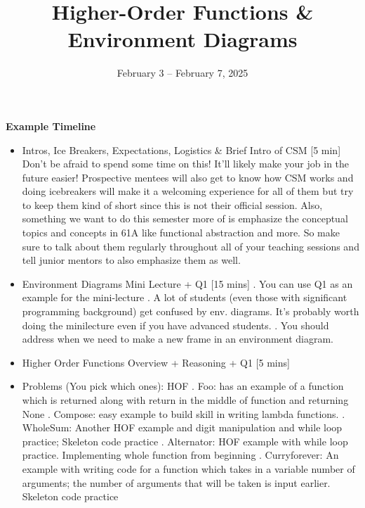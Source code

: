 \documentclass{exam}
\title{Higher-Order Functions \& Environment Diagrams}
\date{February 3 -- February 7, 2025}
\begin{document}
\maketitle

\begin{meta}
    \textbf{Example Timeline}
    \begin{itemize}
        \item Intros, Ice Breakers, Expectations, Logistics \& Brief Intro of CSM [5 min]
        \subitem Don't be afraid to spend some time on this! It'll likely make your job in the future easier! Prospective mentees will also get to know how CSM works and doing icebreakers will make it a welcoming experience for all of them but try to keep them kind of short since this is not their official session.
        \subitem Also, something we want to do this semester more of is emphasize the conceptual topics and concepts in 61A like functional abstraction and more. So make sure to talk about them regularly throughout all of your teaching sessions and tell junior mentors to also emphasize them as well.
        \item Environment Diagrams Mini Lecture + Q1 [15 mins]
        . You can use Q1 as an example for the mini-lecture
        . A lot of students (even those with significant programming background) get confused by env. diagrams. It's probably worth doing the minilecture even if you have advanced students.
        . You should address when we need to make a new frame in an environment diagram.
        \item Higher Order Functions Overview + Reasoning + Q1 [5 mins]
        \item Problems (You pick which ones): HOF 
        . Foo: has an example of a function which is returned along with return in the middle of function and returning None
        . Compose: easy example to build skill in writing lambda functions.
        . WholeSum: Another HOF example and digit manipulation and while loop practice; Skeleton code practice
        . Alternator: HOF example with while loop practice. Implementing whole function from beginning
        . Curryforever: An example with writing code for a function which takes in a variable number of arguments; the number of arguments that will be taken is input earlier. Skeleton code practice
    \end{itemize}
\end{meta} 
\end{document}

